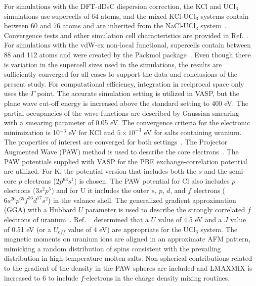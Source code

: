 \documentclass[preprint,3p,10pt,number,sort&compress]{elsarticle}
\begin{document}
For simulations with the DFT-dDsC dispersion correction, the KCl and UCl$_3$ simulations use supercells of 64 atoms, and the mixed KCl-UCl$_3$ systems contain between 60 and 76 atoms and are inherited from the NaCl-UCl$_3$ system~\cite{Andersson}. Convergence tests and other simulation cell characteristics are provided in Ref.~\cite{Andersson}. For simulations with the vdW-cx non-local functional, supercells contain between 88 and 112 atoms and were created by the Packmol package~\cite{packmol}. Even though there is variation in the supercell sizes used in the simulations, the results are sufficiently converged for all cases to support the data and conclusions of the present study. For computational efficiency, integration in reciprocal space only uses the $\Gamma$ point. The accurate simulation setting is utilized in VASP, but the plane wave cut-off energy is increased above the standard setting to 400 eV. The partial occupancies of the wave functions are described by Gaussian smearing with a smearing parameter of 0.05 eV. The convergence criteria for the electronic minimization is 10$^{-3}$ eV for KCl and $5\times10^{-3}$ eV for salts containing uranium. The properties of interest are converged for both settings~\cite{Andersson}. The Projector Augmented Wave (PAW) method is used to describe the core electrons~\cite{PAW1,PAW2}. The PAW potentials supplied with VASP for the PBE exchange-correlation potential are utilized. For K, the potential version that includes both the $s$ and the semi-core $p$ electrons ($2p^63s^1$) is chosen. The PAW potential for Cl also includes $p$ electrons ($3s^2p^5$) and for U it includes the outer $s$, $p$, $d$, and $f$ electrons ($6s^26p^65f^36d^17s^2$) in the valance shell. The generalized gradient approximation (GGA) with a Hubbard $U$ parameter is used to describe the strongly correlated $f$ electrons of uranium~\cite{Andersson}. Ref. ~\cite{Andersson} determined that a $U$ value of 4.5 eV and a $J$ value of 0.51 eV (or a $U_{eff}$ value of 4 eV) are appropriate for the UCl$_3$ system. The magnetic moments on uranium ions are aligned in an approximate AFM pattern, mimicking a random distribution of spins consistent with the prevailing distribution in high-temperature molten salts. Non-spherical contributions related to the gradient of the density in the PAW spheres are included and LMAXMIX is increased to 6 to include $f$-electrons in the charge density mixing routines. 
\end{document}
